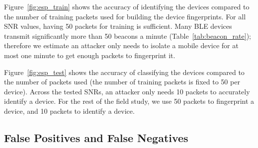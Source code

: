 Figure~\ref{fig:esp_train} shows the accuracy of identifying the
devices compared to the number of training packets used for building the device fingerprints.
For all SNR values, having 50 packets for training is sufficient. Many BLE devices transmit
significantly more than 50 beacons a minute (Table~\ref{tab:beacon_rate});
therefore 
we estimate an attacker only needs to isolate
a mobile device for at most one minute to get enough packets to fingerprint it.


Figure~\ref{fig:esp_test} shows the accuracy of classifying the devices
compared to the number of packets used (the number of training packets is fixed
to 50 per device). 
Across the tested SNRs, an attacker only needs 10 packets to accurately identify a device.
For the rest of the field study, we use 50 packets to fingerprint a device, and
10 packets to identify a device.
\fi





\subsection{False Positives and False Negatives}
\label{sec:results:field}




